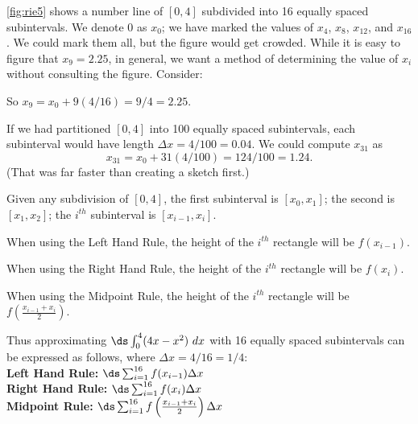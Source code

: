 \autoref{fig:rie5} shows a number line of $[0,4]$ subdivided into 16 equally spaced subintervals. We denote $0$ as $x_0$; we have marked the values of $x_4$, $x_8$, $x_{12}$, and $x_{16}$. We could mark them all, but the figure would get crowded. While it is easy to figure that $x_9=2.25$, in general, we want a method of determining the value of $x_i$ without consulting the figure. Consider:
\begin{center}
\end{center}
So $x_9=x_0+9(4/16)=9/4=2.25$.

If we had partitioned $[0,4]$ into 100 equally spaced subintervals, each subinterval would have length $\Delta x=4/100 = 0.04$. We could compute $x_{31}$ as
\[x_{31}=x_0+31(4/100)=124/100=1.24.\]
(That was far faster than creating a sketch first.)

Given any subdivision of $[0,4]$, the first subinterval is $[x_0,x_1]$; the second is $[x_1,x_2]$; the $i^{th}$ subinterval is $[x_{i-1},x_i]$.

\noindent When using the Left Hand Rule, the height of the $i^{th}$ rectangle will be $f(x_{i-1})$.

\noindent When using the Right Hand Rule, the height of the $i^{th}$ rectangle will be $f(x_i)$.

\noindent When using the Midpoint Rule, the height of the $i^{th}$ rectangle will be $f\left(\frac{x_{i-1}+x_i}{2}\right)$.

Thus approximating $\ds\int_0^4(4x-x^2)\ dx$ with 16 equally spaced subintervals can be expressed as follows, where $\Delta x = 4/16 = 1/4$:\smallskip\\
\textbf{Left Hand Rule:} $\ds\sum_{i=1}^{16} f(x_{i-1})\Delta x$\smallskip\\
\textbf{Right Hand Rule:} $\ds\sum_{i=1}^{16} f(x_i)\Delta x$\smallskip\\
\textbf{Midpoint Rule:} $\ds\sum_{i=1}^{16} f\left(\frac{x_{i-1}+x_i}2\right)\Delta x$

